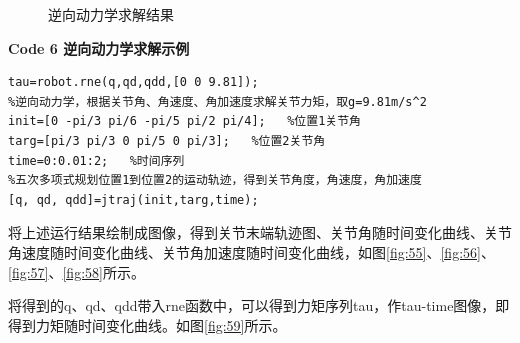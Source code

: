 \documentclass[12pt]{ctexart}
\begin{document}
\begin{figure}[htbp]
    \centering
    \caption{逆向动力学求解结果}
\end{figure}

\newpage
\textbf{Code 6 \quad 逆向动力学求解示例}
\begin{lstlisting}
tau=robot.rne(q,qd,qdd,[0 0 9.81]);   
%逆向动力学，根据关节角、角速度、角加速度求解关节力矩，取g=9.81m/s^2
init=[0 -pi/3 pi/6 -pi/5 pi/2 pi/4];   %位置1关节角
targ=[pi/3 pi/3 0 pi/5 0 pi/3];   %位置2关节角
time=0:0.01:2;   %时间序列
%五次多项式规划位置1到位置2的运动轨迹，得到关节角度，角速度，角加速度
[q, qd, qdd]=jtraj(init,targ,time);
\end{lstlisting}   

将上述运行结果绘制成图像，得到关节末端轨迹图、关节角随时间变化曲线、关节角速度随时间变化曲线、关节角加速度随时间变化曲线，如图\ref{fig:55}、\ref{fig:56}、\ref{fig:57}、\ref{fig:58}所示。

将得到的q、qd、qdd带入rne函数中，可以得到力矩序列tau，作tau-time图像，即得到力矩随时间变化曲线。如图\ref{fig:59}所示。
\end{document}
